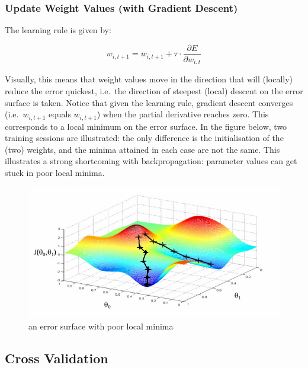 \documentclass[a4paper,11pt]{article}
\begin{document}
\subsubsection{Update Weight Values (with Gradient Descent)}

The learning rule is given by:

\begin{equation}
 w_{i,t+1} = w_{i,t+1} + \tau \cdot \frac{\partial{E}}{\partial{w_{i,t}}}
 \label{eqn:learning_rule}
\end{equation}

Visually, this means that weight values move in the direction that will (locally) reduce the error quickest, i.e.\ the direction of steepest (local) descent on the error surface is taken. Notice that given the learning rule, gradient descent converges (i.e.\ $w_{i,t+1}$ equals $w_{i,t+1}$) when the partial derivative reaches zero. This corresponds to a local minimum on the error surface. In the figure below, two training sessions are illustrated: the only difference is the initialisation of the (two) weights, and the minima attained in each case are not the same. This illustrates a strong shortcoming with backpropagation: parameter values can get stuck in poor local minima.

\begin{figure}[h!]
	\centering
	\includegraphics[scale=0.8]{images/local_minima.png}
	\caption{an error surface with poor local minima}
\end{figure}



\subsection{Cross Validation}
\end{document}
